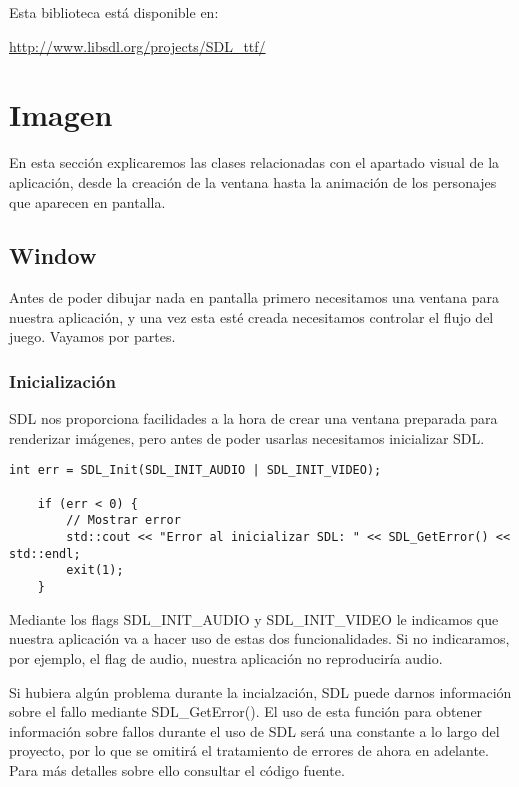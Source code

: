 \documentclass[parskip=half*]{scrartcl}
\begin{document}
	Esta biblioteca est\'a disponible en: \\

	\centerline{\url{http://www.libsdl.org/projects/SDL_ttf/}}


\newpage
\section{Imagen}
En esta secci\'on explicaremos las clases relacionadas con el apartado visual de la aplicaci\'on, desde la creaci\'on de la ventana hasta la animaci\'on de los personajes que aparecen en pantalla.
	\subsection{Window}
	Antes de poder dibujar nada en pantalla primero necesitamos una ventana para nuestra aplicaci\'on, y una vez esta est\'e creada necesitamos controlar el flujo del juego. Vayamos por partes.
		\subsubsection{Inicializaci\'on}
		SDL nos proporciona facilidades a la hora de crear una ventana preparada para renderizar im\'agenes, pero antes de poder usarlas necesitamos inicializar SDL.

		\begin{lstlisting}
int err = SDL_Init(SDL_INIT_AUDIO | SDL_INIT_VIDEO);
    
    if (err < 0) {
        // Mostrar error
        std::cout << "Error al inicializar SDL: " << SDL_GetError() << std::endl;
        exit(1);
    }
		\end{lstlisting}

		Mediante los flags SDL\_INIT\_AUDIO y SDL\_INIT\_VIDEO le indicamos que nuestra aplicaci\'on va a hacer uso de estas dos funcionalidades. Si no indicaramos, por ejemplo, el flag de audio, nuestra aplicaci\'on no reproducir\'ia audio.

		Si hubiera alg\'un problema durante la incialzaci\'on, SDL puede darnos informaci\'on sobre el fallo mediante SDL\_GetError(). El uso de esta funci\'on para obtener informaci\'on sobre fallos durante el uso de SDL ser\'a una constante a lo largo del proyecto, por lo que se omitir\'a el tratamiento de errores de ahora en adelante. Para m\'as detalles sobre ello consultar el c\'odigo fuente.
\end{document}

